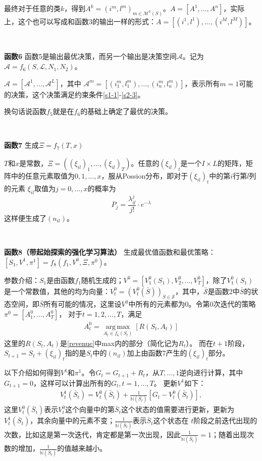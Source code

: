 \documentclass[a4paper,11pt]
{elsarticle}%
\begin{document}
最终对于任意的类$k$，得到$A^k=(i^m,l^m)_{m\in\mathcal{M}^k(S)}$。$A=[A^1,\ldots,A^n]$，实际上，这个也可以写成和函数3的输出一样的形式：$A=[(i^1,l^1),\ldots,(i^M,l^M)]$。

~

\textbf{函数6} 
函数5是输出最优决策，而另一个输出是决策空间$\mathcal{A}$。记为$\mathcal{A}=f_6(S,\mathcal{L},N_1,N_2)$。

$\mathcal{A}=[\mathcal{A}^1,\ldots,\mathcal{A}^L]$，其中
$\mathcal{A}^m=[(i_1^m,l_1^m),\ldots,(i_n^m,l_n^m)]$，表示所有$m=1$可能的决策，这个决策满足约束条件\eqref{s1-1}-\eqref{s2-3}。

换句话说函数$f_5$就是在$f_6$的基础上确定了最优的决策。

~

\textbf{函数7}
生成$\Xi=f_7(T,x)$

$T$和$x$是常数，$\Xi=((\xi_{il})_1,\ldots,(\xi_{il})_T)$。任意的$(\xi_{il})_t$是一个$I\times L$的矩阵，矩阵中的任意元素取值为$0,1,\ldots,x$，服从Possion分布，即对于$(\xi_{il})_t$中的第$i$行第$l$列的元素
$\xi_{il}$取值为$j=0,\ldots,x$的概率为
$$
P_j=\frac{\lambda_{il}^j}{j!}\cdot e^{-\lambda}
$$
这样便生成了$(n_{il})$。

~

\textbf{函数8（带起始探索的强化学习算法）}
生成最优值函数和最优策略：$[S_1,V^1,\pi^1]=f_8(f_1,V^0,\Xi,\pi^0)$。

参数介绍：$S_1$是由函数$f_1$随机生成的；$V^0=[V_1^0(S_1),V_2^0
,\ldots,V_T^0]$，除了$V_1^0(S_1)$是一个常数值，其他的均为向量：$V_t^0=(V_t^0(\bar{S}))_{\bar{S}\in\bar{\mathcal{S}}}$，其中，$\bar{\mathcal{S}}$是函数2中$\bar{S}$的状态空间，即$\bar{S}$所有可能的情况，这里设$V^0$中所有的元素都为0。令第0次迭代的策略
$\pi^0=[A^0_1,\ldots,A^0_T]$，
对于$t=1,2,\ldots,T$，满足
\begin{align}\label{A}
A_t^0=\operatorname*{arg\,max}\limits_{A_t\in f_6(S_t)}[{R}({S}_t,{A}_t)]
\end{align}
这里的$R(S_t,A_t)$是\eqref{revenue}中max内的部分（简化记为$R_t$）。
而在$t+1$阶段，
$S_{t+1}=S_t+(\xi_{il})_t$指的是$S_t$中的$(n_{il})$加上由函数7产生的$(\xi_{il})_t$部分。

以下介绍如何得到$V^1$和$\pi^1$。令$G_{t}=G_{t+1}+R_t$，从$T,\ldots,1$逆向进行计算，其中$G_{t+1}=0$，这样可以计算出所有的$G_t,t=1,\ldots,T$。
更新$V^1$如下：
\begin{align}\label{eq-updatev}
V_t^1(\bar{S}_t)=V_t^{0}(\bar{S}_t)+\frac{1}{\mathbb{N}(\bar{S}_t)}[G_t-V_t^{0}(\bar{S}_t)], 
\end{align}
这里$V_t^0(\bar{S}_t)$表示$V_t^0$这个向量中的第$\bar{S}_t$这个状态的值需要进行更新，更新为$V^1_t(\bar{S}_t)$，其余向量中的元素不变；$\frac{1}{\mathbb{N}(\bar{S}_t)}$表示$\bar{S}_t$这个状态在
$t$阶段之前迭代出现的次数，比如这是第一次迭代，肯定都是第一次出现，因此$\frac{1}{\mathbb{N}(\bar{S}_t)}=1$；随着出现次数的增加，$\frac{1}{\mathbb{N}(\bar{S}_t)}$的值越来越小。
\end{document}
